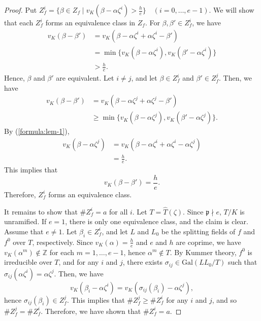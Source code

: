 \documentclass[10pt,a4paper]{amsart}
\newcommand{\field}[1]{\mathbb{#1}}
\newcommand{\Z}{\field{Z}}
\newcommand{\Gal}{\mathrm{Gal}}
\numberwithin{equation}{section}
\begin{document}
\begin{proof}
    Put $Z_f^i = \{\beta \in Z_f \mid v_K(\beta - \alpha\zeta^i) > \frac{h}{e}\} \quad (i = 0, \dots ,e - 1)$. 
    We will show that each $Z_f^i$ forms an equivalence class in $Z_f$. 
    For $\beta, \beta' \in Z_f^i$, we have 
    \begin{align}
      v_K(\beta - \beta') &= v_K(\beta - \alpha\zeta^i + \alpha\zeta^i - \beta') \\
      &= \min\{v_K(\beta - \alpha\zeta^i),v_K(\beta' - \alpha\zeta^i)\} \\
      &> \frac{h}{e}. 
    \end{align}
    Hence, $\beta$ and $\beta'$ are equivalent. 
    Let $i \ne j$, and let $\beta \in Z_f^i$ and $\beta' \in Z_f^j$. 
    Then, we have 
    \begin{align}
      v_K(\beta - \beta') &= v_K(\beta - \alpha\zeta^j + \alpha\zeta^j - \beta') \\
      &\ge \min\{v_K(\beta - \alpha\zeta^j),v_K(\beta' - \alpha\zeta^j)\}. 
    \end{align}
    By (\ref{formula:lem-1}), 
    \begin{align}
      v_K(\beta - \alpha\zeta^j) &= v_K(\beta - \alpha\zeta^i + \alpha\zeta^i - \alpha\zeta^j) \\
      &= \frac{h}{e}. 
    \end{align}
    This implies that 
    \[
      v_K(\beta - \beta') = \frac{h}{e}. 
    \]
    Therefore, $Z_f^i$ forms an equivalence class. 

    It remains to show that $\#Z^i_f = a$ for all $i$. 
    Let $T = \hat{T}(\zeta)$. Since $\mathfrak{p} \nmid e$, $T/K$ is unramified. 
    If $e = 1$, there is only one equivalence class, and the claim is clear. 
    Assume that $e \ne 1$. 
    Let $\beta_i \in Z_f^i$, and let $L$ and $L_0$ be the splitting fields of $f$ and $f^0$ over $T$, respectively. 
    Since $v_K(\alpha) = \frac{h}{e}$ and $e$ and $h$ are coprime, we have $v_K(\alpha^m) \notin \Z$ for each $m = 1, \dots ,e-1$, hence $\alpha^m \notin T$. 
    By Kummer theory, $f^0$ is irreducible over $T$, and for any $i$ and $j$, there exists $\sigma_{ij} \in \Gal(LL_0/T)$ such that $\sigma_{ij}(\alpha \zeta^i) = \alpha \zeta^j$. 
    Then, we have 
    \[
      v_K(\beta_i - \alpha\zeta^i) = v_K(\sigma_{ij}(\beta_i) - \alpha\zeta^j), 
    \]
    hence $\sigma_{ij}(\beta_i) \in Z^j_f$. This implies that $\#Z^j_f \ge \#Z^i_f$ for any $i$ and $j$, and so $\#Z^j_f = \#Z^i_f$. 
    Therefore, we have shown that $\#Z^i_f = a$. 
  \end{proof}
  
\end{document}
